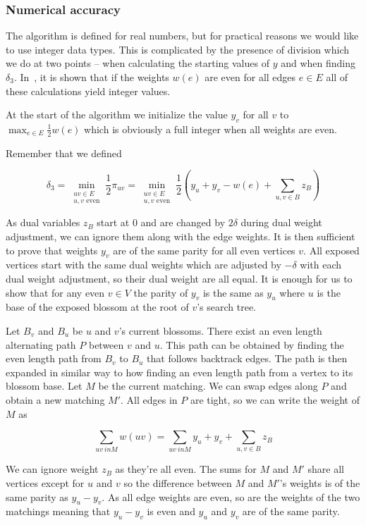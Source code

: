 \subsubsection{Numerical accuracy}

The algorithm is defined for real numbers, but for practical reasons we would like to use integer data types. This is complicated by the presence of division which we do at two points – when calculating the starting values of $y$ and when finding $\delta_3$. In~\cite{gabow1974implementation}, it is shown that if the weights $w(e)$ are even for all edges $e\in E$ all of these calculations yield integer values.

At the start of the algorithm we initialize the value $y_v$ for all $v$ to $\max_{e \in E} \frac{1}{2}w(e)$ which is obviously a full integer when all weights are even.

Remember that we defined

\[\delta_3=\min_{\substack{uv\in E \\ \text{$u, v$ even}}} \frac{1}{2}\pi_{uv} = \min_{\substack{uv\in E \\ \text{$u, v$ even}}} \frac{1}{2}\left(y_u + y_v - w(e) + \sum_{u, v \in B} z_B\right)\] 

As dual variables $z_B$ start at $0$ and are changed by $2\delta$ during dual weight adjustment, we can ignore them along with the edge weights. It is then sufficient to prove that weights $y_v$ are of the same parity for all even vertices $v$. All exposed vertices start with the same dual weights which are adjusted by $-\delta$ with each dual weight adjustment, so their dual weight are all equal. It is enough for us to show that for any even $v \in V$ the parity of $y_v$ is the same as $y_u$ where $u$ is the base of the exposed blossom at the root of $v$'s search tree. 

Let $B_v$ and $B_u$ be $u$ and $v$'s current blossoms. There exist an even length alternating path $P$ between $v$ and $u$. This path can be obtained by finding the even length path from $B_v$ to $B_u$ that follows backtrack edges. The path is then expanded in similar way to how finding an even length path from a vertex to its blossom base. Let $M$ be the current matching. We can swap edges along $P$ and obtain a new matching $M'$. All edges in $P$ are tight, so we can write the weight of $M$ as

\[\sum_{uv \ in M} w(uv) = \sum_{uv \ in M} y_u + y_v + \sum_{u, v \in B} z_B\]

We can ignore weight $z_B$ as they're all even. The sums for $M$ and $M'$ share all vertices except for $u$ and $v$ so the difference between $M$ and $M'$'s weights is of the same parity as $y_u - y_v$. As all edge weights are even, so are the weights of the two matchings meaning that $y_u - y_v$ is even and $y_u$ and $y_v$ are of the same parity.

